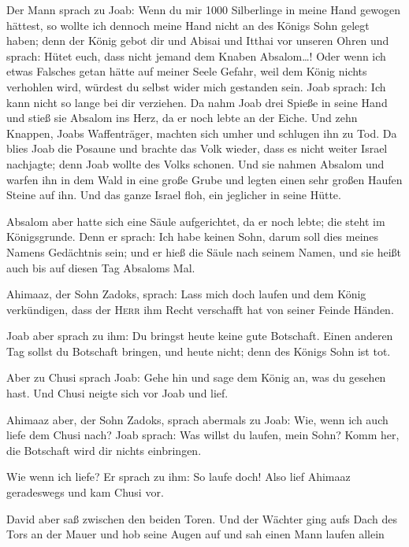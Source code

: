  Der Mann sprach zu Joab: Wenn du mir 1000 Silberlinge in
meine Hand gewogen hättest, so wollte ich dennoch meine Hand nicht an
des Königs Sohn gelegt haben; denn der König gebot dir und Abisai und
Itthai vor unseren Ohren und sprach: Hütet euch, dass nicht jemand dem
Knaben Absalom\ldots!  Oder wenn ich etwas Falsches getan
hätte auf meiner Seele Gefahr, weil dem König nichts verhohlen wird,
würdest du selbst wider mich gestanden sein.  Joab
sprach: Ich kann nicht so lange bei dir verziehen. Da nahm Joab drei
Spieße in seine Hand und stieß sie Absalom ins Herz, da er noch lebte an
der Eiche.  Und zehn Knappen, Joabs Waffenträger, machten
sich umher und schlugen ihn zu Tod.  Da blies Joab die
Posaune und brachte das Volk wieder, dass es nicht weiter Israel
nachjagte; denn Joab wollte des Volks schonen.  Und sie
nahmen Absalom und warfen ihn in dem Wald in eine große Grube und legten
einen sehr großen Haufen Steine auf ihn. Und das ganze Israel floh, ein
jeglicher in seine Hütte.

 Absalom aber hatte sich eine Säule aufgerichtet, da er
noch lebte; die steht im Königsgrunde. Denn er sprach: Ich habe keinen
Sohn, darum soll dies meines Namens Gedächtnis sein; und er hieß die
Säule nach seinem Namen, und sie heißt auch bis auf diesen Tag Absaloms
Mal.

 Ahimaaz, der Sohn Zadoks, sprach: Lass mich doch laufen
und dem König verkündigen, dass der \textsc{Herr} ihm Recht verschafft
hat von seiner Feinde Händen.

 Joab aber sprach zu ihm: Du bringst heute keine gute
Botschaft. Einen anderen Tag sollst du Botschaft bringen, und heute
nicht; denn des Königs Sohn ist tot.

 Aber zu Chusi sprach Joab: Gehe hin und sage dem König
an, was du gesehen hast. Und Chusi neigte sich vor Joab und lief.

 Ahimaaz aber, der Sohn Zadoks, sprach abermals zu Joab:
Wie, wenn ich auch liefe dem Chusi nach? Joab sprach: Was willst du
laufen, mein Sohn? Komm her, die Botschaft wird dir nichts einbringen.

 Wie wenn ich liefe? Er sprach zu ihm: So laufe doch!
Also lief Ahimaaz geradeswegs und kam Chusi vor.

 David aber saß zwischen den beiden Toren. Und der
Wächter ging aufs Dach des Tors an der Mauer und hob seine Augen auf und
sah einen Mann laufen allein

